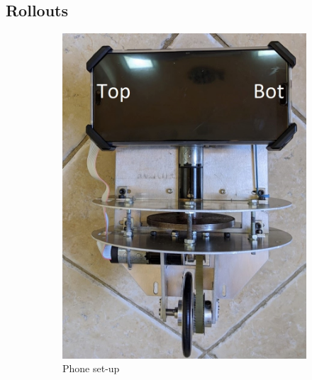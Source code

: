\documentclass[twoside,twocolumn,12pt]{article}
\begin{document}
\subsection{Rollouts}
\onecolumn
\begin{figure}[t]
  \centering
  \begin{subfigure}[t]{0.325\textwidth}
    \includegraphics[width=\linewidth]{front_lab}
   \caption{Phone set-up}
  \label{fig:set_up}
  \end{subfigure}
  \begin{subfigure}[t]{0.325\textwidth}

\end{subfigure}
\end{figure}
\end{document}
